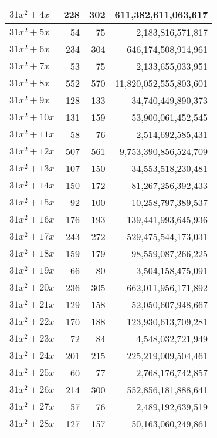 \documentclass[a4paper]{amsproc}
\theoremstyle{plain}
\theoremstyle{named}
\begin{document}
\begin{longtable}{ | l | r | r | r | }
$31x^2 + 4x$ & 228 & 302 & 611{,}382{,}611{,}063{,}617 \\ \hline
$31x^2 + 5x$ & 54 & 75 & 2{,}183{,}816{,}571{,}817 \\ \hline
$31x^2 + 6x$ & 234 & 304 & 646{,}174{,}508{,}914{,}961 \\ \hline
$31x^2 + 7x$ & 53 & 75 & 2{,}133{,}655{,}033{,}951 \\ \hline
$31x^2 + 8x$ & 552 & 570 & 11{,}820{,}052{,}555{,}803{,}601 \\ \hline
$31x^2 + 9x$ & 128 & 133 & 34{,}740{,}449{,}890{,}373 \\ \hline
$31x^2 + 10x$ & 131 & 159 & 53{,}900{,}061{,}452{,}545 \\ \hline
$31x^2 + 11x$ & 58 & 76 & 2{,}514{,}692{,}585{,}431 \\ \hline
$31x^2 + 12x$ & 507 & 561 & 9{,}753{,}390{,}856{,}524{,}709 \\ \hline
$31x^2 + 13x$ & 107 & 150 & 34{,}553{,}518{,}230{,}481 \\ \hline
$31x^2 + 14x$ & 150 & 172 & 81{,}267{,}256{,}392{,}433 \\ \hline
$31x^2 + 15x$ & 92 & 100 & 10{,}258{,}797{,}389{,}537 \\ \hline
$31x^2 + 16x$ & 176 & 193 & 139{,}441{,}993{,}645{,}936 \\ \hline
$31x^2 + 17x$ & 243 & 272 & 529{,}475{,}544{,}173{,}031 \\ \hline
$31x^2 + 18x$ & 159 & 179 & 98{,}559{,}087{,}266{,}225 \\ \hline
$31x^2 + 19x$ & 66 & 80 & 3{,}504{,}158{,}475{,}091 \\ \hline
$31x^2 + 20x$ & 236 & 305 & 662{,}011{,}956{,}171{,}892 \\ \hline
$31x^2 + 21x$ & 129 & 158 & 52{,}050{,}607{,}948{,}667 \\ \hline
$31x^2 + 22x$ & 170 & 188 & 123{,}930{,}613{,}709{,}281 \\ \hline
$31x^2 + 23x$ & 72 & 84 & 4{,}548{,}032{,}721{,}949 \\ \hline
$31x^2 + 24x$ & 201 & 215 & 225{,}219{,}009{,}504{,}461 \\ \hline
$31x^2 + 25x$ & 60 & 77 & 2{,}768{,}176{,}742{,}857 \\ \hline
$31x^2 + 26x$ & 214 & 300 & 552{,}856{,}181{,}888{,}641 \\ \hline
$31x^2 + 27x$ & 57 & 76 & 2{,}489{,}192{,}639{,}519 \\ \hline
$31x^2 + 28x$ & 127 & 157 & 50{,}163{,}060{,}249{,}861 \\ \hline

\end{longtable}
\end{document}
